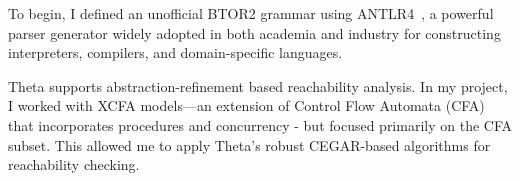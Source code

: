
To begin, I defined an unofficial BTOR2 grammar using ANTLR4~\cite{antlr}, a powerful parser generator widely adopted in both academia and industry for constructing interpreters, compilers, and domain-specific languages.

Theta supports abstraction-refinement based reachability analysis. In my project, I worked with XCFA models—an extension of Control Flow Automata (CFA) that incorporates procedures and concurrency - but focused primarily on the CFA subset. This allowed me to apply Theta's robust CEGAR-based algorithms for reachability checking.


